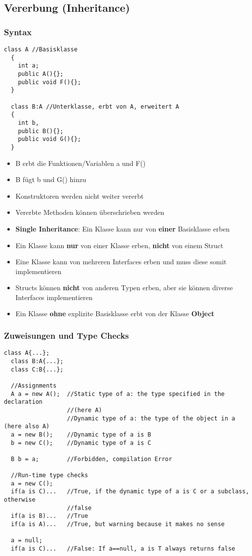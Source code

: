 \subsection{Vererbung (Inheritance)}
\subsubsection{Syntax}
\begin{lstlisting}[style=Csharp]
  class A //Basisklasse
  {
    int a; 
    public A(){};
    public void F(){};
  }
  
  class B:A //Unterklasse, erbt von A, erweitert A
  {
    int b, 
    public B(){};
    public void G(){};
  }
\end{lstlisting}
\begin{itemize}
  \item B erbt die Funktionen/Variablen a und F()
  \item B fügt b und G() hinzu
  \item Konstruktoren werden nicht weiter vererbt
  \item Vererbte Methoden können überschrieben werden
  \item \textbf{Single Inheritance}: Ein Klasse kann nur von \textbf{einer}
  Basisklasse erben 
  \item Ein Klasse kann \textbf{nur} von einer Klasse erben, \textbf{nicht} von
  einem Struct
  \item Eine Klasse kann von mehreren Interfaces erben und 
  muss diese somit implementieren
  \item Structs können \textbf{nicht} von anderen Typen erben, aber sie können
  diverse Interfaces implementieren
  \item Ein Klasse \textbf{ohne} explizite Basisklasse erbt von der Klasse
  \textbf{Object}
\end{itemize}
 
\subsubsection{Zuweisungen und Type Checks}
\begin{lstlisting}[style=Csharp]
  class A{...};
  class B:A{...};
  class C:B{...};
  
  //Assignments
  A a = new A();  //Static type of a: the type specified in the declaration
                  //(here A)
                  //Dynamic type of a: the type of the object in a (here also A)
  a = new B();    //Dynamic type of a is B
  b = new C();    //Dynamic type of a is C
  
  B b = a;        //Forbidden, compilation Error
  
  //Run-time type checks
  a = new C(); 
  if(a is C)...   //True, if the dynamic type of a is C or a subclass, otherwise
                  //false
  if(a is B)...   //True
  if(a is A)...   //True, but warning because it makes no sense
  
  a = null; 
  if(a is C)...   //False: If a==null, a is T always returns false
\end{lstlisting}

